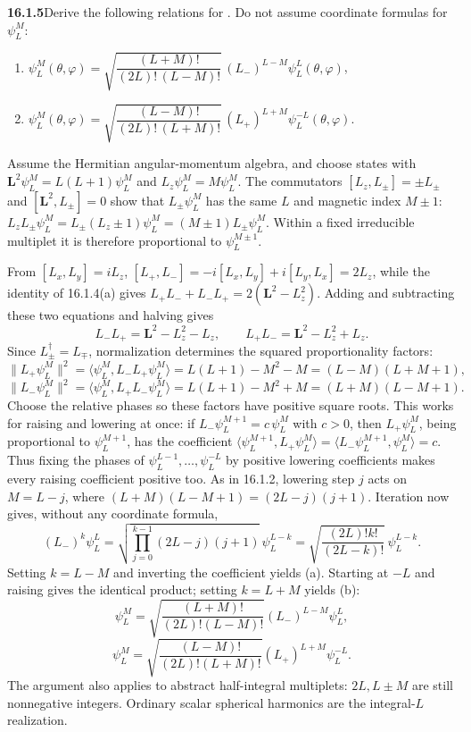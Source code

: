\par\bigskip
\noindent\textbf{16.1.5}\quad Derive the following relations for
. Do not assume coordinate
formulas for $\psi_L^M$:
\begin{enumerate}
\item[(a)] $\psi_{L}^{M}(\theta,\varphi)
=\sqrt{\dfrac{(L+M)!}{(2L)!\,(L-M)!}}\,
(L_{-})^{L-M}\psi_{L}^{L}(\theta,\varphi)$,
\item[(b)] $\psi_{L}^{M}(\theta,\varphi)
=\sqrt{\dfrac{(L-M)!}{(2L)!\,(L+M)!}}\,
(L_{+})^{L+M}\psi_{L}^{-L}(\theta,\varphi)$.
\end{enumerate}
\solution
{}
Assume the Hermitian angular-momentum algebra, and choose states with
$\mathbf L^2\psi_L^M=L(L+1)\psi_L^M$ and
$L_z\psi_L^M=M\psi_L^M$. The commutators
$[L_z,L_\pm]=\pm L_\pm$ and $[\mathbf L^2,L_\pm]=0$ show that
$L_\pm\psi_L^M$ has the same $L$ and magnetic index $M\pm1$:
$L_zL_\pm\psi_L^M=L_\pm(L_z\pm1)\psi_L^M=(M\pm1)L_\pm\psi_L^M$.
Within a fixed irreducible multiplet it is therefore proportional
to $\psi_L^{M\pm1}$.

From $[L_x,L_y]=iL_z$,
$[L_+,L_-]=-i[L_x,L_y]+i[L_y,L_x]=2L_z$, while the identity of
16.1.4(a) gives $L_+L_-+L_-L_+=2(\mathbf L^2-L_z^2)$. Adding and
subtracting these two equations and halving gives
\[
L_-L_+=\mathbf L^2-L_z^2-L_z,\qquad
L_+L_-=\mathbf L^2-L_z^2+L_z.
\]
Since $L_\pm^\dagger=L_\mp$, normalization determines the squared
proportionality factors:
\[
\|L_+\psi_L^M\|^2=\langle\psi_L^M,L_-L_+\psi_L^M\rangle
=L(L+1)-M^2-M=(L-M)(L+M+1),
\]
\[
\|L_-\psi_L^M\|^2=\langle\psi_L^M,L_+L_-\psi_L^M\rangle
=L(L+1)-M^2+M=(L+M)(L-M+1).
\]
Choose the relative phases so these factors have positive square roots.
This works for raising and lowering at once: if
$L_-\psi_L^{M+1}=c\,\psi_L^M$ with $c>0$, then $L_+\psi_L^M$, being
proportional to $\psi_L^{M+1}$, has the coefficient
$\langle\psi_L^{M+1},L_+\psi_L^M\rangle
=\langle L_-\psi_L^{M+1},\psi_L^M\rangle=c$.
Thus fixing the phases of $\psi_L^{L-1},\ldots,\psi_L^{-L}$ by positive
lowering coefficients makes every raising coefficient positive too.
As in 16.1.2, lowering step $j$ acts on $M=L-j$, where
$(L+M)(L-M+1)=(2L-j)(j+1)$.
Iteration now gives, without any coordinate formula,
\[
(L_-)^k\psi_L^L
=\sqrt{\prod_{j=0}^{k-1}(2L-j)(j+1)}\,\psi_L^{L-k}
=\sqrt{\frac{(2L)!k!}{(2L-k)!}}\,\psi_L^{L-k}.
\]
Setting $k=L-M$ and inverting the coefficient yields (a).
Starting at $-L$ and raising gives the identical product; setting
$k=L+M$ yields (b):
\[
\boxed{\psi_L^M=\sqrt{\frac{(L+M)!}{(2L)!(L-M)!}}
(L_-)^{L-M}\psi_L^L},
\]
\[
\boxed{\psi_L^M=\sqrt{\frac{(L-M)!}{(2L)!(L+M)!}}
(L_+)^{L+M}\psi_L^{-L}}.
\]
The argument also applies to abstract half-integral multiplets:
$2L,L\pm M$ are still nonnegative integers. Ordinary scalar
spherical harmonics are the integral-$L$ realization.

